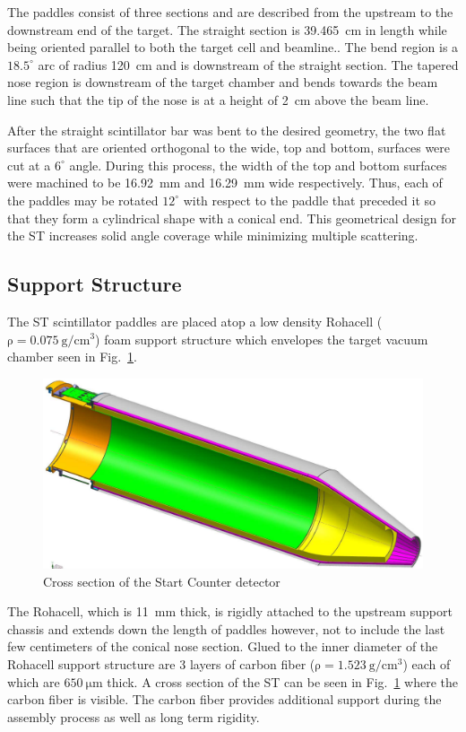 The paddles consist of three sections and are described from the upstream to the downstream end of the target.  The straight section is 39.465~cm in length while being oriented parallel to both the target cell and beamline..  The bend region is a $18.5^{\circ}$ arc of radius 120~cm and is downstream of the straight section. The tapered nose region is downstream of the target chamber and bends towards the beam line such that the tip of the nose is at a height of 2~cm above the beam line.  

After the straight scintillator bar was bent to the desired geometry, the two flat surfaces that are oriented orthogonal to the wide, top and bottom, surfaces were cut at a $6^{\circ}$ angle.  During this process, the width of the top and bottom surfaces were machined to be 16.92~mm and 16.29~mm wide respectively.  Thus, each of the paddles may be rotated $12^{\circ}$ with respect to the paddle that preceded it so that they form a cylindrical shape with a conical end.  This geometrical design for the ST increases solid angle coverage while minimizing multiple scattering.  

\subsection{Support Structure} \label{sec:design_support}

The ST scintillator paddles are placed atop a low density Rohacell ($\mathrm{\rho = 0.075\ g/cm^{3}}$) foam support structure which envelopes the target vacuum chamber seen in Fig.~\ref{fig:stiso}.  
	\begin{figure}[!htb]
		\centering
		\includegraphics[width=1.0\columnwidth]{design/figs/st_iso}
		\caption{Cross section of the Start Counter detector}
		\label{fig:stiso}
	\end{figure}
The Rohacell, which is 11~mm thick, is rigidly attached to the upstream support chassis and extends down the length of paddles however, not to include the last few centimeters of the conical nose section.  Glued to the inner diameter of the Rohacell support structure are 3 layers of carbon fiber ($\mathrm{\rho = 1.523\ g/cm^{3}}$) each of which are $\mathrm{650\ \mu m}$ thick.  A cross section of the ST can be seen in Fig.~\ref{fig:stiso} where the carbon fiber is visible.  The carbon fiber provides additional support during the assembly process as well as long term rigidity.  

